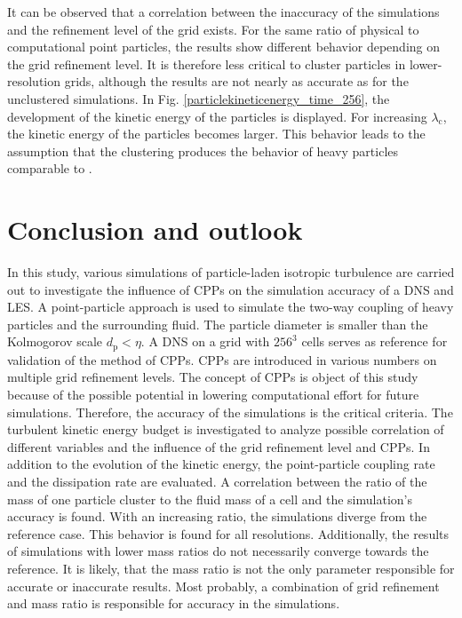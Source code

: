\documentclass[11pt,a4paper,openany,oneside,parskip=half*]{article}
\begin{document}
It can be observed that a correlation between the inaccuracy of the simulations and the refinement level of the grid exists. For the same ratio of physical to computational point particles, the results show different behavior depending on the grid refinement level. It is therefore less critical to cluster particles in lower-resolution grids, although the results are not nearly as accurate as for the unclustered simulations. 
\newline %
In Fig. \ref{particlekineticenergy_time_256}, the development of the kinetic energy of the particles is displayed. For increasing $\lambda_\mathrm{c}$, the kinetic energy of the particles becomes larger. This behavior leads to the assumption that the clustering produces the behavior of heavy particles comparable to \cite{Schneiders2017}. 
\pagebreak
\section{Conclusion and outlook}
In this study, various simulations of particle-laden isotropic turbulence are carried out to investigate the influence of CPPs on the simulation accuracy of a DNS and LES. A point-particle approach is used to simulate the two-way coupling of heavy particles and the surrounding fluid. The particle diameter is smaller than the Kolmogorov scale $d_\mathrm{p} < \eta$. A DNS on a grid with $256^3$ cells serves as reference for validation of the method of CPPs. CPPs are introduced in various numbers on multiple grid refinement levels. The concept of CPPs is object of this study because of the possible potential in lowering computational effort for future simulations. Therefore, the accuracy of the simulations is the critical criteria. The turbulent kinetic energy budget is investigated to analyze possible correlation of different variables and the influence of the grid refinement level and CPPs. In addition to the evolution of the kinetic energy, the point-particle coupling rate and the dissipation rate are evaluated.
\newline
A correlation between the ratio of the mass of one particle cluster to the fluid mass of a cell and the simulation's accuracy is found. With an increasing ratio, the simulations diverge from the reference case. This behavior is found for all resolutions. Additionally, the results of simulations with lower mass ratios do not necessarily converge towards the reference. It is likely, that the mass ratio is not the only parameter responsible for accurate or inaccurate results. Most probably, a combination of grid refinement and mass ratio is responsible for accuracy in the simulations.
\end{document}
